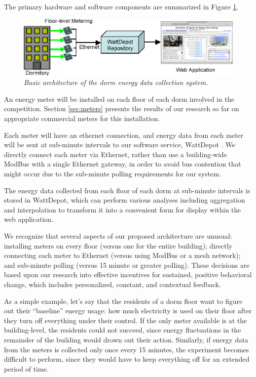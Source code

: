\documentclass[11pt]{article}
\begin{document}
The primary hardware and software components are summarized in Figure \ref{fig:architecture}.

\begin{figure}[!ht]
  \center
  \includegraphics[width=1.0\textwidth]{architecture.ppt.eps}
  \caption{\em \small Basic architecture of the dorm energy data collection system.}
 \label{fig:architecture}
\end{figure} 

An energy meter will be installed on each floor of each dorm involved in
the competition.  Section \ref{sec:meters} presents the results of our
research so far on appropriate commercial meters for this installation. 

Each meter will have an ethernet connection, and energy data from each
meter will be sent at sub-minute intervals to our software service,
WattDepot \cite{WattDepot}.  We directly connect each meter via Ethernet,
rather than use a building-wide ModBus with a single Ethernet gateway, in
order to avoid bus contention that might occur due to the sub-minute
polling requirements for our system.

The energy data collected from each floor of each dorm at sub-minute
intervals is stored in WattDepot, which can perform various analyses
including aggregation and interpolation to transform it into a
convenient form for display within the web application.

We recognize that several aspects of our proposed architecture are unusual:
installing meters on every floor (versus one for the entire building);
directly connecting each meter to Ethernet (versus using ModBus or a mesh
network); and sub-minute polling (versus 15 minute or greater polling).
These decisions are based upon our research into effective incentives for
sustained, positive behavioral change, which includes personalized,
constant, and contextual feedback.  

As a simple example, let's say that the residents of a dorm floor want to
figure out their ``baseline'' energy usage: how much electricity is used on
their floor after they turn off everything under their control.  If the
only meter available is at the building-level, the residents could not
succeed, since energy fluctuations in the remainder of the building would
drown out their action.  Similarly, if energy data from the meters is collected
only once every 15 minutes, the experiment becomes difficult to perform,
since they would have to keep everything off for an extended period of
time.  
\end{document}
